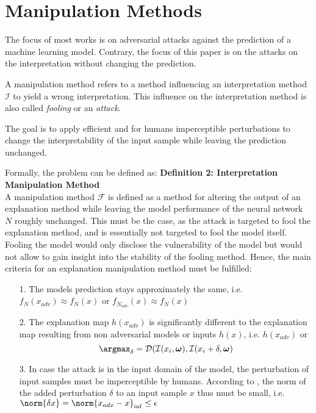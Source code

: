 \section{Manipulation Methods}
\label{sec:manipulation_methods}


The focus of most works is on adversarial attacks against the prediction of a machine learning model. Contrary, the focus of this paper is on the attacks on the interpretation without changing the prediction.


A manipulation method refers to a method influencing an interpretation method $\mathcal{I}$ to yield a wrong interpretation. This influence on the interpretation method is also called \textit{fooling} or an \textit{attack}. 

The goal is to apply efficient and for humans imperceptible perturbations to change the interpretability of the input sample while leaving the prediction unchanged. 

Formally, the problem can be defined as: 
\textbf{Definition 2: Interpretation Manipulation Method}\\
A manipulation method $\mathcal{F}$ is defined as a method for altering the output of an explanation method while leaving the model performance of the neural network $N$ roughly unchanged. 
This must be the case, as the attack is targeted to fool the explanation method, and is essentially not targeted to fool the model itself. Fooling the model would only disclose the vulnerability of the model but would not allow to gain insight into the stability of the fooling method. 
Hence, the main criteria for an explanation manipulation method must be fulfilled: 
\begin{enumerate}
    \item[1.] The models prediction stays approximately the same, i.e. $f_N(x_{adv}) \approx f_N(x)$ or $f_{N_{adv}}(x) \approx f_N(x)$
    \item[2.] The explanation map $h(x_{adv})$ is significantly different to the explanation map resulting from non adversarial models or inputs $h(x)$, i.e. $h(x_{adv})$ or $$\argmax_{\delta} = \mathcal{D}(\mathcal{I}(x_i, \boldsymbol{\omega}), \mathcal{I}(x_i+\delta, \boldsymbol{\omega})$$
    \item[3.] In case the attack is in the input domain of the model, the perturbation of input samples must be imperceptible by humans. According to \cite{dombrowski2019explanations}, the norm of the added perturbation $\delta$ to an input sample $x$ thus must be small, i.e. $\norm{\delta x} = \norm{x_{adx}-x}_{\inf} \leq \epsilon$ %
\end{enumerate}

